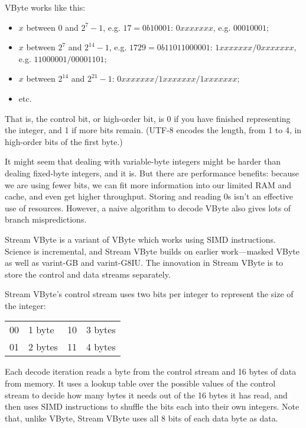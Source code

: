 VByte works like this:
\vspace*{-1em}
\begin{itemize}[noitemsep]
\item $x$ between 0 and $2^7-1$, e.g. $17 = 0b10001$: $0xxx xxxx$, e.g. $0001 0001$;
\item $x$ between $2^7$ and $2^{14}-1$, e.g. $1729 = 0b110 11000001$:
                   $1xxx xxxx/0xxx xxxx$, e.g. $1100 0001/0000 1101$;
\item $x$ between $2^{14}$ and $2^{21}-1$: $0xxx xxxx/1xxx xxxx/1xxx xxxx$;
\item etc.
\end{itemize}
That is, the control bit, or high-order bit, is 0 if you have finished representing the integer,
and 1 if more bits remain. (UTF-8 encodes the length, from 1 to 4, in high-order bits of the first byte.)

It might seem that dealing with variable-byte integers might be
harder than dealing fixed-byte integers, and it is. But there are performance benefits: because we are
using fewer bits, we can fit more information into our limited RAM and
cache, and even get higher throughput. Storing and reading 0s isn't an effective
use of resources. However, a naive algorithm to decode VByte also gives
lots of branch mispredictions.

Stream VByte is a variant of VByte which works using SIMD instructions.
Science is incremental, and Stream VByte builds on earlier work---masked VByte
as well as {\sc varint}-GB and {\sc varint}-G8IU. The innovation in
Stream VByte is to store the control and data streams separately.

Stream VByte's control stream uses two bits per integer to represent the size of the integer:
\begin{center}
\vspace*{-1em}
\begin{tabular}{ll@{~~~~~~~~}ll}
00 & 1 byte & 10 & 3 bytes\\
01 & 2 bytes & 11 & 4 bytes
\end{tabular}
\end{center}

Each decode iteration reads a byte from the control stream and 16 bytes of data from memory.
It uses a lookup table over the possible values of the control stream to decide how many
bytes it needs out of the 16 bytes it has read, and then uses SIMD instructions to shuffle
the bits each into their own integers. Note that, unlike VByte, Stream VByte uses all 8 bits
of each data byte as data.

